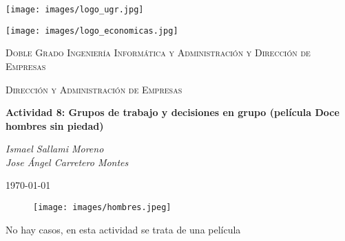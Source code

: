 \documentclass{article}
\newcommand{\myTitle}{Actividad 8: Grupos de trabajo y decisiones en grupo (película Doce
hombres sin piedad)}
\newcommand{\myAuthor}{Ismael Sallami Moreno \\ Jose Ángel Carretero Montes}
\newcommand{\myDegree}{Doble Grado Ingeniería Informática y Administración y Dirección de Empresas}
\newcommand{\mySubject}{Dirección y Administración de Empresas}
\newcommand{\myDate}{\today}
\begin{document}
\begin{titlepage}
    \centering
    \begin{minipage}{0.45\textwidth}
        \centering
        \texttt{[image: images/logo\_ugr.jpg]}
    \end{minipage}
    \hfill
    \begin{minipage}{0.45\textwidth}
        \centering
        \texttt{[image: images/logo\_economicas.jpg]} 
    \end{minipage}
    \vspace{1cm}
    
    {\scshape\LARGE \myDegree \par}
    \vspace{1cm}
    {\scshape\Large \mySubject \par}
    \vspace{1.5cm}
    {\huge\bfseries \myTitle \par}
    \vspace{2cm}
    {\Large\itshape \myAuthor \par}
    \vfill
    \myDate\par
    \vspace{2cm}
    \begin{figure}[H]
        \centering
        \texttt{[image: images/hombres.jpeg]}
    \end{figure}
\end{titlepage}

\tableofcontents
\newpage

No hay casos, en esta actividad se trata de una película
\end{document}
